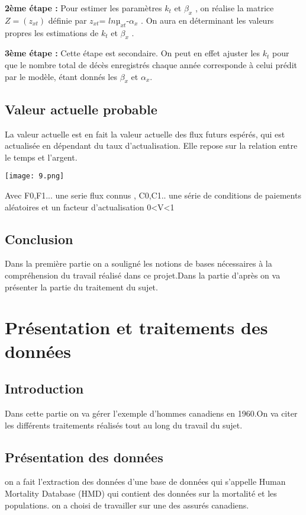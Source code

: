 \documentclass{article}
\begin{document}
{{\large \textbf{2ème étape :}}
{\large Pour estimer  les paramètres $k_{t}$ et $\beta_{x}$ , on réalise la matrice $Z=(z_{xt})$ définie par $z_{xt}$= $lnµ_{xt}$-$\alpha_{x}$ . On aura en déterminant les valeurs propres les estimations de $k_{t}$ et $\beta_{x}$ .} 

{\large \textbf{3ème étape :}}
{\large Cette étape est secondaire. On peut en effet ajuster les $k_{t}$ pour que le nombre total de décès enregistrés chaque année corresponde à celui prédit par le modèle, étant donnés les $\beta_{x}$ et $\alpha_{x}$.}

\subsection{Valeur actuelle probable}
{ \large La valeur actuelle est en fait  la valeur actuelle des flux futurs espérés, qui est actualisée en dépendant du taux d'actualisation. Elle repose sur la relation entre le temps et l'argent.}

\texttt{[image: 9.png]}

{\large Avec F0,F1... une serie flux connus , C0,C1.. une série de conditions de paiements aléatoires et un facteur d'actualisation 0<V<1}
\subsection{Conclusion}
{\large Dans la première partie on a souligné les notions de bases nécessaires à la compréhension du travail réalisé dans ce projet.Dans la partie d'après on va présenter la partie du traitement du sujet.}
\newpage
\section{Présentation et traitements des données}
\subsection{Introduction}
{\large Dans cette partie on va gérer l'exemple d'hommes canadiens en 1960.On va citer les différents traitements réalisés tout au long du travail du sujet. }
\subsection{Présentation des données}
{\large on a fait l'extraction des données d'une base de données qui s'appelle Human Mortality Database (HMD) qui contient des données sur la mortalité et les populations.
on a choisi de travailler sur une  des assurés canadiens.}

}
\end{document}
